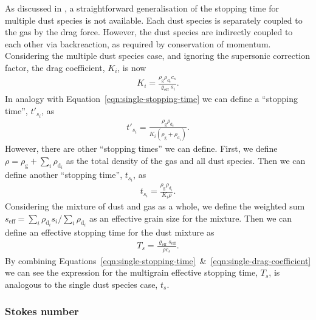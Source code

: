 \documentclass[fleqn,usenatbib]{mnras}
\newcommand{\g}{\mathrm{g}}
\newcommand{\dd}{\mathrm{d}}
\begin{document}
As discussed in \citet{Hutchison2018MNRAS.476.2186H}, a straightforward
generalisation of the stopping time for multiple dust species is not available.
Each dust species is separately coupled to the gas by the drag force. However,
the dust species are indirectly coupled to each other via backreaction, as
required by conservation of momentum. Considering the multiple dust species
case, and ignoring the supersonic correction factor, the drag coefficient,
\(K_i\), is now
%
\begin{align}
   \label{eqn:drag-coefficient}
   K_i = \frac{\rho_{\g} \rho_{\dd_i} c_s}{\varrho_{\mathrm{eff}} s_i}.
\end{align}
%
In analogy with Equation~\ref{eqn:single-stopping-time} we can define a
``stopping time'', \(t'_{s_i}\), as
%
\begin{align}
   \label{eqn:alternative-stopping-time}
   t'_{s_i} = \frac{\rho_{\g} \rho_{\dd_i}}{K_i (\rho_{\g} + \rho_{\dd_i})}.
\end{align}
%
However, there are other ``stopping times'' we can define. First, we define
\(\rho = \rho_{\g} + \sum_i \rho_{\dd_i}\) as the total density of the gas and
all dust species. Then we can define another ``stopping time'', \(t_{s_i}\), as
%
\begin{align}
   \label{eqn:stopping-time}
   t_{s_i} = \frac{\rho_{\g} \rho_{\dd_i}}{K_i \rho}.
\end{align}
%
Considering the mixture of dust and gas as a whole, we define the weighted sum
\(s_{\mathrm{eff}} = \sum_i \rho_{\dd_i} s_i / \sum_i \rho_{\dd_i}\) as an
effective grain size for the mixture. Then we can define an effective stopping
time for the dust mixture as
%
\begin{align}
   \label{eqn:effective-stopping-time}
   T_s = \frac{\varrho_{\mathrm{eff}} s_{\mathrm{eff}}}{\rho c_s}.
\end{align}
%
By combining
Equations~\ref{eqn:single-stopping-time}~\&~\ref{eqn:single-drag-coefficient} we
can see the expression for the multigrain effective stopping time, \(T_s\), is
analogous to the single dust species case, \(t_s\).

\subsubsection{Stokes number}
\end{document}
